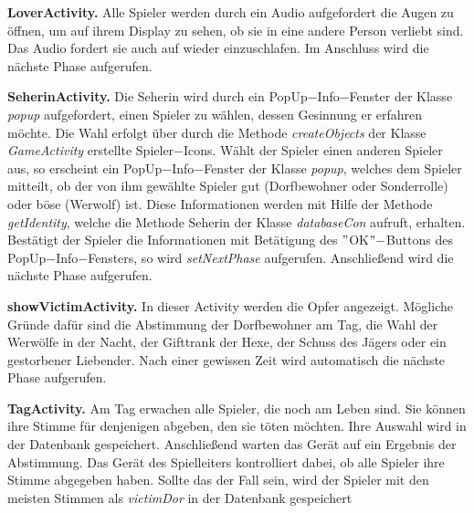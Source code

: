 \documentclass[12pt, a4paper]{article}
\begin{document}
\vspace{0,3 cm}    
      
\textbf{LoverActivity.}
Alle Spieler werden durch ein Audio aufgefordert die Augen zu öffnen, um auf ihrem Display zu sehen, ob sie in eine andere Person verliebt sind. Das Audio fordert sie auch auf wieder einzuschlafen. Im Anschluss wird die nächste Phase aufgerufen.

\vspace{0,3 cm}

\textbf{SeherinActivity.}
Die Seherin wird durch ein PopUp$-$Info$-$Fenster der Klasse \textit{popup} aufgefordert, einen Spieler zu wählen, dessen Gesinnung er erfahren möchte. Die Wahl erfolgt über durch die Methode \textit{createObjects} der Klasse \textit{GameActivity} erstellte Spieler$-$Icons. Wählt der Spieler einen anderen Spieler aus, so erscheint ein PopUp$-$Info$-$Fenster der Klasse \textit{popup}, welches dem Spieler mitteilt, ob der von ihm gewählte Spieler gut (Dorfbewohner oder Sonderrolle) oder böse (Werwolf) ist. Diese Informationen werden mit Hilfe der Methode \textit{getIdentity}, welche die Methode Seherin der Klasse \textit{databaseCon} aufruft, erhalten. Bestätigt der Spieler die Informationen mit Betätigung des $"$OK$"-$Buttons des  PopUp$-$Info$-$Fensters, so wird \textit{setNextPhase} aufgerufen. Anschließend wird die nächste Phase aufgerufen.

\vspace{0,3 cm}      
   
\textbf{showVictimActivity.}
In dieser Activity werden die Opfer angezeigt.
Mögliche Gründe dafür sind die Abstimmung der Dorfbewohner am Tag, die Wahl der Werwölfe in der
Nacht, der Gifttrank der Hexe, der Schuss des Jägers oder ein gestorbener Liebender.
Nach einer gewissen Zeit wird automatisch die nächste Phase aufgerufen.

\vspace{0,3 cm}      
      
\textbf{TagActivity.}
Am Tag erwachen alle Spieler, die noch am Leben sind. 
Sie können ihre Stimme für denjenigen abgeben, den sie töten möchten. Ihre Auswahl wird in der Datenbank
gespeichert. Anschließend warten das Gerät auf ein Ergebnis der Abstimmung.
Das Gerät des Spielleiters kontrolliert dabei, ob alle Spieler ihre Stimme abgegeben haben.
Sollte das der Fall sein, wird der Spieler mit den meisten Stimmen als \textit{victimDor} in der Datenbank
gespeichert      

\vspace{0,3 cm}
\end{document}
